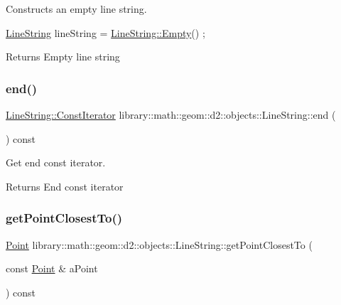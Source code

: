 Constructs an empty line string. 


\begin{DoxyCode}
\hyperlink{classlibrary_1_1math_1_1geom_1_1d2_1_1objects_1_1_line_string_aa313a076051c7fb722b9eeb6d5bf2f7e}{LineString} lineString = \hyperlink{classlibrary_1_1math_1_1geom_1_1d2_1_1objects_1_1_line_string_af8a783642dc4ba67d4e0ca2140cda343}{LineString::Empty}() ;
\end{DoxyCode}


\begin{DoxyReturn}{Returns}
Empty line string 
\end{DoxyReturn}
\mbox{\label{classlibrary_1_1math_1_1geom_1_1d2_1_1objects_1_1_line_string_af86afe62a24b648504822b3adc6c5ecd}} 
\subsubsection{\texorpdfstring{end()}{end()}}
{\footnotesize\ttfamily \hyperlink{classlibrary_1_1math_1_1geom_1_1d2_1_1objects_1_1_line_string_a7c7a81b557da8ed855b5f4b88a5fa837}{Line\+String\+::\+Const\+Iterator} library\+::math\+::geom\+::d2\+::objects\+::\+Line\+String\+::end (\begin{DoxyParamCaption}{ }\end{DoxyParamCaption}) const}



Get end const iterator. 

\begin{DoxyReturn}{Returns}
End const iterator 
\end{DoxyReturn}
\mbox{\label{classlibrary_1_1math_1_1geom_1_1d2_1_1objects_1_1_line_string_a038dba8bffbcaaf498a349341458db4a}} 
\subsubsection{\texorpdfstring{get\+Point\+Closest\+To()}{getPointClosestTo()}}
{\footnotesize\ttfamily \hyperlink{classlibrary_1_1math_1_1geom_1_1d2_1_1objects_1_1_point}{Point} library\+::math\+::geom\+::d2\+::objects\+::\+Line\+String\+::get\+Point\+Closest\+To (\begin{DoxyParamCaption}\item[{const \hyperlink{classlibrary_1_1math_1_1geom_1_1d2_1_1objects_1_1_point}{Point} \&}]{a\+Point }\end{DoxyParamCaption}) const}



